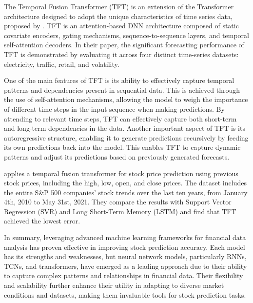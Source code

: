 \documentclass{article}
\begin{document}
The Temporal Fusion Transformer (TFT) is an extension of the Transformer architecture designed to adopt the unique characteristics of time series data, proposed by \citep{lim2021temporal}. TFT is an attention-based DNN architecture composed of static covariate encoders, gating mechanisms, sequence-to-sequence layers, and temporal self-attention decoders. In their paper, the significant forecasting performance of TFT is demonstrated by evaluating it across four distinct time-series datasets: electricity, traffic, retail, and volatility.

One of the main features of TFT is its ability to effectively capture temporal patterns and dependencies present in sequential data. This is achieved through the use of self-attention mechanisms, allowing the model to weigh the importance of different time steps in the input sequence when making predictions. By attending to relevant time steps, TFT can effectively capture both short-term and long-term dependencies in the data. Another important aspect of TFT is its autoregressive structure, enabling it to generate predictions recursively by feeding its own predictions back into the model. This enables TFT to capture dynamic patterns and adjust its predictions based on previously generated forecasts.

\cite{hu2021stock} applies a temporal fusion transformer for stock price prediction using previous stock prices, including the high, low, open, and close prices. The dataset includes the entire S\&P 500 companies' stock trends over the last ten years, from January 4th, 2010 to May 31st, 2021. They compare the results with Support Vector Regression (SVR) and Long Short-Term Memory (LSTM) and find that TFT achieved the lowest error.

In summary, leveraging advanced machine learning frameworks for financial data analysis has proven effective in improving stock prediction accuracy. Each model has its strengths and weaknesses, but neural network models, particularly RNNs, TCNs, and transformers, have emerged as a leading approach due to their ability to capture complex patterns and relationships in financial data. Their flexibility and scalability further enhance their utility in adapting to diverse market conditions and datasets, making them invaluable tools for stock prediction tasks.
\end{document}
